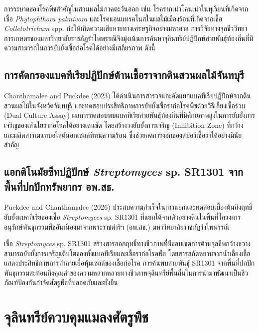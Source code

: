 การระบาดของโรคพืชสำคัญในสวนผลไม้ภาคตะวันออก เช่น โรครากเน่าโคนเน่าในทุเรียนที่เกิดจากเชื้อ \textit{Phytophthora palmivora} และโรคแอนแทรคโนสในผลไม้เมืองร้อนที่เกิดจากเชื้อ \textit{Colletotrichum} spp. ก่อให้เกิดความเสียหายทางเศรษฐกิจอย่างมหาศาล การวิจัยทางจุลชีววิทยาการเกษตรของมหาวิทยาลัยราชภัฏรำไพพรรณีจึงมุ่งเน้นการค้นหาจุลินทรีย์ปฏิปักษ์สายพันธุ์ท้องถิ่นที่มีความสามารถในการยับยั้งเชื้อก่อโรคได้อย่างมีเสถียรภาพ ดังนี้

\subsection{การคัดกรองแบคทีเรียปฏิปักษ์ต้านเชื้อราจากดินสวนผลไม้จันทบุรี}
Chanthamalee and Puckdee (2023) ได้ดำเนินการสำรวจและคัดแยกแบคทีเรียปฏิปักษ์จากดินสวนผลไม้ในจังหวัดจันทบุรี และทดสอบประสิทธิภาพการยับยั้งเชื้อราก่อโรคพืชด้วยวิธีเลี้ยงเชื้อร่วม (Dual Culture Assay) ผลการทดสอบพบแบคทีเรียสายพันธุ์ท้องถิ่นที่มีศักยภาพสูงในการยับยั้งการเจริญของเส้นใยราก่อโรคได้อย่างเด่นชัด โดยสร้างวงยับยั้งการเจริญ (Inhibition Zone) ที่กว้าง และผลิตสารเมแทบอไลต์นอกเซลล์ที่ทนความร้อน ซึ่งช่วยลดการงอกของสปอร์เชื้อราได้อย่างมีนัยสำคัญ

\subsection{แอกติโนมัยซีทปฏิปักษ์ \textit{Streptomyces} sp. SR1301 จากพื้นที่ปกปักทรัพยากร อพ.สธ.}
Puckdee and Chanthamalee (2026) ประสบความสำเร็จในการแยกและทดสอบเบื้องต้นถึงฤทธิ์ยับยั้งแบคทีเรียของเชื้อ \textit{Streptomyces} sp. SR1301 ที่แยกได้จากตัวอย่างดินในพื้นที่โครงการอนุรักษ์พันธุกรรมพืชอันเนื่องมาจากพระราชดำริฯ (อพ.สธ.) มหาวิทยาลัยราชภัฏรำไพพรรณี

เชื้อ \textit{Streptomyces} sp. SR1301 สร้างสารออกฤทธิ์ทางชีวภาพที่มีขอบเขตการต้านจุลชีพกว้างขวาง สามารถยับยั้งการเจริญเติบโตของทั้งแบคทีเรียและเชื้อราก่อโรคพืช โดยสารสกัดหยาบจากน้ำเลี้ยงเชื้อแสดงประสิทธิภาพการทำลายเยื่อหุ้มเซลล์ของเชื้อก่อโรค การค้นพบสายพันธุ์ SR1301 จากพื้นที่ปกปักพันธุกรรมสะท้อนถึงคุณค่าของความหลากหลายทางชีวภาพจุลินทรีย์พื้นถิ่นในการนำมาพัฒนาเป็นชีวภัณฑ์ป้องกันกำจัดศัตรูพืชที่ปลอดภัยและยั่งยืน

\section{จุลินทรีย์ควบคุมแมลงศัตรูพืช}

